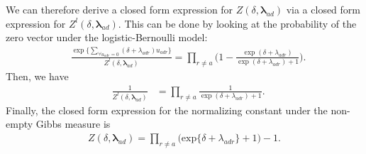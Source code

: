 \documentclass{article}
\begin{document}
 	 We can therefore derive a closed form expression for $Z(\delta,\boldsymbol{\lambda}_{ad})$ via a closed form expression for $Z^{l}(\delta,\boldsymbol{\lambda}_{ad})$. This can be done by looking at the probability of the zero vector under the logistic-Bernoulli model:
 	 \begin{equation*}
 	 	\begin{aligned}
 	 		&\frac{\exp\Big\{ \sum\limits_{\forall u_{adr}=0}(\delta+\lambda_{adr})u_{adr} \Big\}}{Z^{l}(\delta,\boldsymbol{\lambda}_{ad})}= \prod_{r \neq a}   \Big(1-\frac{ \exp{(\delta+\lambda_{adr})}}{\exp{(\delta+\lambda_{adr})} + 1}\Big).
 	 	\end{aligned}  
 	 \end{equation*}
 	 Then, we have 
 	 \begin{equation*}
 	 	\begin{aligned}
 	 		& \frac{1}{Z^{l}(\delta,\boldsymbol{\lambda}_{ad})} &= \prod\limits_{r \neq a}\frac{1}{ \exp(\delta+\lambda_{adr})+ 1}.
 	 	\end{aligned}  
 	 \end{equation*}
 	 Finally, the closed form expression for the normalizing constant under the non-empty Gibbs measure is  \begin{equation*}
 	 	\begin{aligned}Z(\delta,\boldsymbol{\lambda}_{ad}) = \prod_{r \neq a } \big(\mbox{exp}\{\delta+\lambda_{adr}\} + 1\big)-1.
 	 	\end{aligned}  
 	 \end{equation*}
\end{document}
